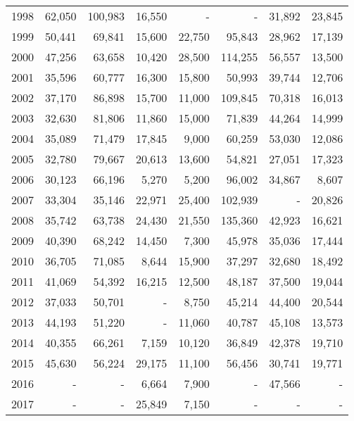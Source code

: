 \begin{longtable}{lrrrrrrr}
  1998 & 62,050 & 100,983 & 16,550 & - & - & 31,892 & 23,845 \\ 
  1999 & 50,441 & 69,841 & 15,600 & 22,750 & 95,843 & 28,962 & 17,139 \\ 
  2000 & 47,256 & 63,658 & 10,420 & 28,500 & 114,255 & 56,557 & 13,500 \\ 
  2001 & 35,596 & 60,777 & 16,300 & 15,800 & 50,993 & 39,744 & 12,706 \\ 
  2002 & 37,170 & 86,898 & 15,700 & 11,000 & 109,845 & 70,318 & 16,013 \\ 
  2003 & 32,630 & 81,806 & 11,860 & 15,000 & 71,839 & 44,264 & 14,999 \\ 
  2004 & 35,089 & 71,479 & 17,845 & 9,000 & 60,259 & 53,030 & 12,086 \\ 
  2005 & 32,780 & 79,667 & 20,613 & 13,600 & 54,821 & 27,051 & 17,323 \\ 
  2006 & 30,123 & 66,196 & 5,270 & 5,200 & 96,002 & 34,867 & 8,607 \\ 
  2007 & 33,304 & 35,146 & 22,971 & 25,400 & 102,939 & - & 20,826 \\ 
  2008 & 35,742 & 63,738 & 24,430 & 21,550 & 135,360 & 42,923 & 16,621 \\ 
  2009 & 40,390 & 68,242 & 14,450 & 7,300 & 45,978 & 35,036 & 17,444 \\ 
  2010 & 36,705 & 71,085 & 8,644 & 15,900 & 37,297 & 32,680 & 18,492 \\ 
  2011 & 41,069 & 54,392 & 16,215 & 12,500 & 48,187 & 37,500 & 19,044 \\ 
  2012 & 37,033 & 50,701 & - & 8,750 & 45,214 & 44,400 & 20,544 \\ 
  2013 & 44,193 & 51,220 & - & 11,060 & 40,787 & 45,108 & 13,573 \\ 
  2014 & 40,355 & 66,261 & 7,159 & 10,120 & 36,849 & 42,378 & 19,710 \\ 
  2015 & 45,630 & 56,224 & 29,175 & 11,100 & 56,456 & 30,741 & 19,771 \\ 
  2016 & - & - & 6,664 & 7,900 & - & 47,566 & - \\ 
  2017 & - & - & 25,849 & 7,150 & - & - & - \\ 
   \hline
\hline
\end{longtable}
\endgroup

